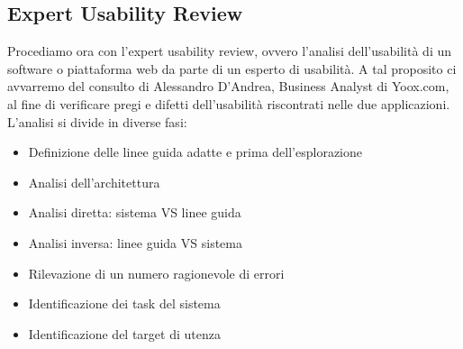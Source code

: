 \subsection{Expert Usability Review}
Procediamo ora con l'expert usability review, ovvero l'analisi dell'usabilità di un software o piattaforma web da parte di un esperto di usabilità. A tal proposito ci avvarremo del consulto di Alessandro D'Andrea, Business Analyst di Yoox.com, al fine di verificare pregi e difetti dell'usabilità riscontrati nelle due applicazioni.\\
L'analisi si divide in diverse fasi:
\begin{itemize}
\item Definizione delle linee guida adatte e prima dell'esplorazione
\item Analisi dell'architettura
\item Analisi diretta: sistema VS linee guida
\item Analisi inversa: linee guida VS sistema
\item Rilevazione di un numero ragionevole di errori
\item Identificazione dei task del sistema
\item Identificazione del target di utenza
\end{itemize}

